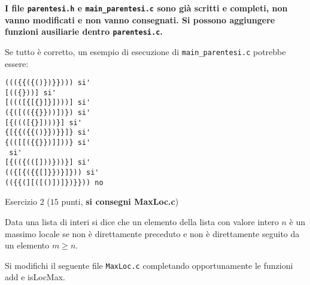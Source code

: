 \documentclass[12pt]{article}
\begin{document}
%
\begin{mdframed}[backgroundcolor=lightred] 
  \vspace*{-0.5ex}
  \textbf{I file \texttt{parentesi.h} e \texttt{main\_parentesi.c} sono gi\`a scritti e completi, non vanno modificati e non vanno consegnati. Si possono aggiungere funzioni ausiliarie dentro \texttt{parentesi.c}.}
\end{mdframed}
%
Se tutto \`e corretto, un esempio di esecuzione di \texttt{main\_parentesi.c} potrebbe essere:
%
\begin{mdframed}[backgroundcolor=verylightgray] 
\begin{verbatim}
((({{({()})}}))) si'
[(({}))] si'
[((([{[{}]}])))] si'
({([(({{}}))])}) si'
[{((([{}])))}] si'
{[{{({{()}})}}]} si'
{(([[({{}})]]))} si'
 si'
[{(({(([]))}))}] si'
(({[{({{[]}})}]})) si'
(({{(][([()])]})}})) no
\end{verbatim}
\end{mdframed}

\begin{center}Esercizio 2 ($15$ punti, \textbf{si consegni {MaxLoc.c}})
\end{center}

Data una lista di interi si dice che un elemento della lista con valore intero ${n}$ è un massimo locale se non è direttamente preceduto e non è direttamente seguito da un elemento ${m\ge n}.$ 
%

Si modifichi il seguente file \texttt{MaxLoc.c} completando opportunamente le funzioni add e isLocMax.
\end{document}
